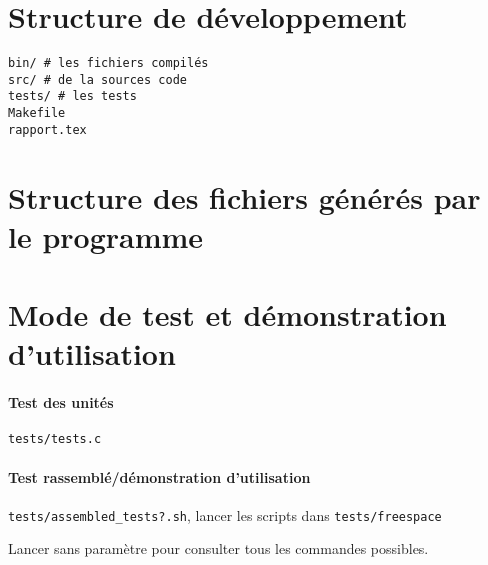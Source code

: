 \documentclass{report}
\begin{document}
\section{Structure de développement}

\begin{verbatim}
bin/ # les fichiers compilés
src/ # de la sources code
tests/ # les tests
Makefile
rapport.tex
\end{verbatim}

\section{Structure des fichiers générés par le programme}

\section{Mode de test et démonstration d'utilisation}

\paragraph{Test des unités} \verb|tests/tests.c|
\paragraph{Test rassemblé/démonstration d'utilisation} \verb|tests/assembled_tests?.sh|, lancer
les scripts dans \verb|tests/freespace|

Lancer sans paramètre pour consulter tous les commandes possibles.
\end{document}
